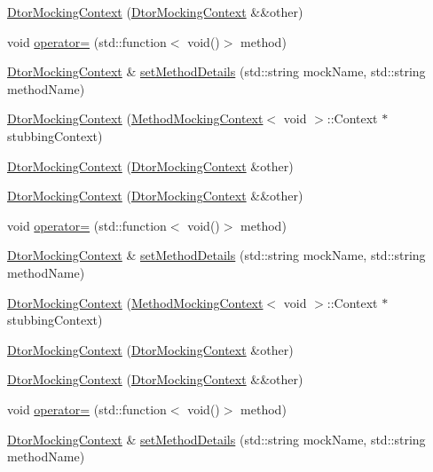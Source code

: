 \begin{DoxyCompactItemize}
\item 
\mbox{\hyperlink{classfakeit_1_1DtorMockingContext_a0cf507524171b8ab2884f269a8a62a60}{Dtor\+Mocking\+Context}} (\mbox{\hyperlink{classfakeit_1_1DtorMockingContext}{Dtor\+Mocking\+Context}} \&\&other)
\item 
void \mbox{\hyperlink{classfakeit_1_1DtorMockingContext_ac65118e0817e56484fb2238d6c1b3f46}{operator=}} (std\+::function$<$ void()$>$ method)
\item 
\mbox{\hyperlink{classfakeit_1_1DtorMockingContext}{Dtor\+Mocking\+Context}} \& \mbox{\hyperlink{classfakeit_1_1DtorMockingContext_ac2e3a23d87a1f48613dd5bf73f457309}{set\+Method\+Details}} (std\+::string mock\+Name, std\+::string method\+Name)
\item 
\mbox{\hyperlink{classfakeit_1_1DtorMockingContext_a81c785463a44f396c4c3e5e0e1c9e40d}{Dtor\+Mocking\+Context}} (\mbox{\hyperlink{classfakeit_1_1MethodMockingContext}{Method\+Mocking\+Context}}$<$ void $>$\+::Context $\ast$stubbing\+Context)
\item 
\mbox{\hyperlink{classfakeit_1_1DtorMockingContext_a03939798c9836d082d94fe4e84d3dcd3}{Dtor\+Mocking\+Context}} (\mbox{\hyperlink{classfakeit_1_1DtorMockingContext}{Dtor\+Mocking\+Context}} \&other)
\item 
\mbox{\hyperlink{classfakeit_1_1DtorMockingContext_a0cf507524171b8ab2884f269a8a62a60}{Dtor\+Mocking\+Context}} (\mbox{\hyperlink{classfakeit_1_1DtorMockingContext}{Dtor\+Mocking\+Context}} \&\&other)
\item 
void \mbox{\hyperlink{classfakeit_1_1DtorMockingContext_ac65118e0817e56484fb2238d6c1b3f46}{operator=}} (std\+::function$<$ void()$>$ method)
\item 
\mbox{\hyperlink{classfakeit_1_1DtorMockingContext}{Dtor\+Mocking\+Context}} \& \mbox{\hyperlink{classfakeit_1_1DtorMockingContext_ac2e3a23d87a1f48613dd5bf73f457309}{set\+Method\+Details}} (std\+::string mock\+Name, std\+::string method\+Name)
\item 
\mbox{\hyperlink{classfakeit_1_1DtorMockingContext_a81c785463a44f396c4c3e5e0e1c9e40d}{Dtor\+Mocking\+Context}} (\mbox{\hyperlink{classfakeit_1_1MethodMockingContext}{Method\+Mocking\+Context}}$<$ void $>$\+::Context $\ast$stubbing\+Context)
\item 
\mbox{\hyperlink{classfakeit_1_1DtorMockingContext_a03939798c9836d082d94fe4e84d3dcd3}{Dtor\+Mocking\+Context}} (\mbox{\hyperlink{classfakeit_1_1DtorMockingContext}{Dtor\+Mocking\+Context}} \&other)
\item 
\mbox{\hyperlink{classfakeit_1_1DtorMockingContext_a0cf507524171b8ab2884f269a8a62a60}{Dtor\+Mocking\+Context}} (\mbox{\hyperlink{classfakeit_1_1DtorMockingContext}{Dtor\+Mocking\+Context}} \&\&other)
\item 
void \mbox{\hyperlink{classfakeit_1_1DtorMockingContext_ac65118e0817e56484fb2238d6c1b3f46}{operator=}} (std\+::function$<$ void()$>$ method)
\item 
\mbox{\hyperlink{classfakeit_1_1DtorMockingContext}{Dtor\+Mocking\+Context}} \& \mbox{\hyperlink{classfakeit_1_1DtorMockingContext_ac2e3a23d87a1f48613dd5bf73f457309}{set\+Method\+Details}} (std\+::string mock\+Name, std\+::string method\+Name)
\end{DoxyCompactItemize}
